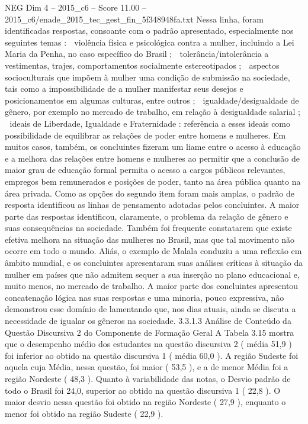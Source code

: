 \begin{textsample}{NEG Dim 4 – 2015\_c6 – Score 11.00 – 2015\_c6/enade\_2015\_tec\_gest\_fin\_5f348948fa.txt}
Nessa linha, foram identificadas respostas, consoante com o padrão apresentado, especialmente nos seguintes temas :  violência física e psicológica contra a mulher, incluindo a Lei Maria da Penha, no caso específico do Brasil ;  tolerância/intolerância a vestimentas, trajes, comportamentos socialmente estereotipados ;  aspectos socioculturais que impõem à mulher uma condição de submissão na sociedade, tais como a impossibilidade de a mulher manifestar seus desejos e posicionamentos em algumas culturas, entre outros ;  igualdade/desigualdade de gênero, por exemplo no mercado de trabalho, em relação à desigualdade salarial ;  ideais de Liberdade, Igualdade e Fraternidade : referência a esses ideais como possibilidade de equilibrar as relações de poder entre homens e mulheres.
Em muitos casos, também, os concluintes fizeram um liame entre o acesso à educação e a melhora das relações entre homens e mulheres ao permitir que a conclusão de maior grau de educação formal permita o acesso a cargos públicos relevantes, empregos bem remunerados e posições de poder, tanto na área pública quanto na área privada.
Como as opções do segundo item foram mais amplas, o padrão de resposta identificou as linhas de pensamento adotadas pelos concluintes.
A maior parte das respostas identificou, claramente, o problema da relação de gênero e suas consequências na sociedade.
Também foi frequente constatarem que existe efetiva melhora na situação das mulheres no Brasil, mas que tal movimento não ocorre em todo o mundo.
Aliás, o exemplo de Malala conduziu a uma reflexão em âmbito mundial, e os concluintes apresentaram suas análises críticas à situação da mulher em países que não admitem sequer a sua inserção no plano educacional e, muito menos, no mercado de trabalho.
A maior parte dos concluintes apresentou concatenação lógica nas suas respostas e uma minoria, pouco expressiva, não demonstrou esse domínio de lamentando que, nos dias atuais, ainda se discuta a necessidade de igualar os gêneros na sociedade. 3.3.1.3 Análise de Conteúdo da Questão Discursiva 2 do Componente de Formação Geral A Tabela 3.15 mostra que o desempenho médio dos estudantes na questão discursiva 2 ( média 51,9 ) foi inferior ao obtido na questão discursiva 1 ( média 60,0 ).
A região Sudeste foi aquela cuja Média, nessa questão, foi maior ( 53,5 ), e a de menor Média foi a região Nordeste ( 48,3 ).
Quanto à variabilidade das notas, o Desvio padrão de todo o Brasil foi 24,0, superior ao obtido na questão discursiva 1 ( 22,8 ).
O maior desvio nessa questão foi obtido na região Nordeste ( 27,9 ), enquanto o menor foi obtido na região Sudeste ( 22,9 ).

\end{textsample}
